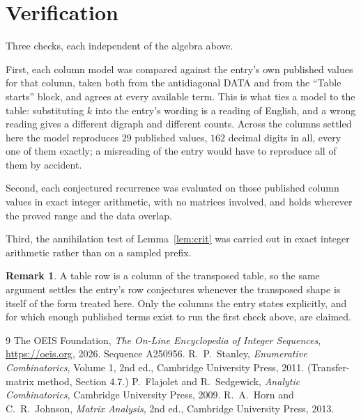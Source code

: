 \documentclass[11pt,a4paper]{article}
\theoremstyle{plain}
\theoremstyle{definition}
\newtheorem{remark}[theorem]{Remark}
\begin{document}
\section{Verification}

Three checks, each independent of the algebra above.

First, each column model was compared against the entry's own published values for that
column, taken both from the antidiagonal DATA and from the ``Table starts'' block, and agrees
at every available term. This is what ties a model to the table: substituting $k$ into the
entry's wording is a reading of English, and a wrong reading gives a different digraph and
different counts. Across the columns settled here the model reproduces $29$ published
values, $162$ decimal digits in all, every one of them exactly; a misreading of the entry
would have to reproduce all of them by accident.

Second, each conjectured recurrence was evaluated on those published column values in exact
integer arithmetic, with no matrices involved, and holds wherever the proved range and the
data overlap.

Third, the annihilation test of Lemma~\ref{lem:crit} was carried out in exact integer
arithmetic rather than on a sampled prefix.

\begin{remark}
A table row is a column of the transposed table, so the same argument settles the entry's row
conjectures whenever the transposed shape is itself of the form treated here. Only the columns
the entry states explicitly, and for which enough published terms exist to run the first check
above, are claimed.
\end{remark}

\begin{thebibliography}{9}
 The OEIS Foundation, \emph{The On-Line Encyclopedia of Integer
Sequences}, \url{https://oeis.org}, 2026. Sequence A250956.
 R.~P.~Stanley, \emph{Enumerative Combinatorics}, Volume 1, 2nd ed.,
Cambridge University Press, 2011. (Transfer-matrix method, Section 4.7.)
 P.~Flajolet and R.~Sedgewick, \emph{Analytic Combinatorics}, Cambridge
University Press, 2009.
 R.~A.~Horn and C.~R.~Johnson, \emph{Matrix Analysis}, 2nd ed., Cambridge
University Press, 2013.
\end{thebibliography}
\end{document}
